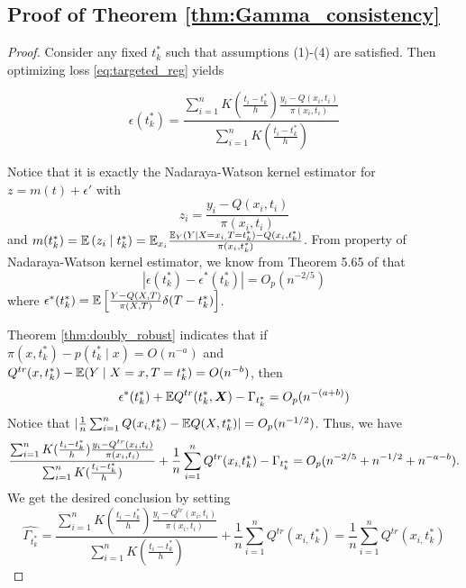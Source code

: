 \subsection{Proof of Theorem \ref{thm:Gamma_consistency}}
\begin{proof}
Consider any fixed $t_k^*$ such that assumptions (1)-(4) are satisfied. Then optimizing loss \eqref{eq:targeted_reg} yields

\[
\epsilon(t_{k}^{*})=\frac{\sum_{i=1}^{n}K(\frac{t_{i}-t_{k}^{*}}{h})\frac{y_{i}-Q(x_{i},t_{i})}{\pi(x_{i},t_{i})}}{\sum_{i=1}^{n}K(\frac{t_{i}-t_{k}^{*}}{h})}
\]

Notice that it is exactly the Nadaraya-Watson kernel estimator for $z=m(t)+\epsilon'$ with
\[
z_{i}=\frac{y_{i}-Q(x_{i},t_{i})}{\pi(x_{i},t_{i})}
\]
 and $m(t_{k}^{*})=\mathbb{E}\left(z_{i}\mid t_{k}^{*}\right)=\mathbb{E}_{x_{i}}\frac{\mathbb{E}_{Y}\left(Y\mid X=x_{i,}T=t_{k}^{*}\right)-Q(x_{i},t_{k}^{*})}{\pi(x_{i},t_{k}^{*})}$.
From property of Nadaraya-Watson kernel estimator, we know from Theorem 5.65 of \cite{wasserman2006all} that 
\[
|\epsilon(t_k^*)-\epsilon^{*}(t_k^*)|=O_p(n^{-2/5})
\]
where $\epsilon^{*}(t_k^*)=\mathbb{E}\left[\frac{Y-Q(X,T)}{\pi(X,T)}\delta(T-t_k^*)\right]$.

Theorem \ref{thm:doubly_robust} indicates that
if $\pi(x,t_k^*)-p(t_k^*\mid x)=O(n^{-a})$ and $Q^{tr}(x,t_k^*)-\mathbb{E}(Y\mid X=x,T=t_k^*)=O(n^{-b})$, then
$$
\epsilon^*(t_k^*)+\mathbb{E} Q^{tr}(t_k^*,\boldsymbol{X})-\Gamma_{t_k^*}=O_p(n^{-(a+b)})
$$
Notice that $|\frac{1}{n}\sum_{i=1}^{n}Q(x_{i,}t_{k}^{*})-\mathbb{E} Q(X,t_{k}^{*})|=O_p(n^{-1/2})$. Thus, we have 
\[
\frac{\sum_{i=1}^{n}K(\frac{t_{i}-t_{k}^{*}}{h})\frac{y_{i}-Q^{tr}(x_{i},t_{i})}{\pi(x_{i},t_{i})}}{\sum_{i=1}^{n}K(\frac{t_{i}-t_{k}^{*}}{h})}+\frac{1}{n}\sum_{i=1}^{n}Q^{tr}(x_{i,}t_{k}^{*})-\Gamma_{t_{k}^{*}}=O_{p}(n^{-2/5}+n^{-1/2}+n^{-a-b}).
\]
We get the desired conclusion by setting
$$
\widehat{\Gamma_{t_{k}^{*}}}
=
\frac{\sum_{i=1}^{n}K(\frac{t_{i}-t_{k}^{*}}{h})\frac{y_{i}-Q^{tr}(x_{i},t_{i})}{\pi(x_{i},t_{i})}}{\sum_{i=1}^{n}K(\frac{t_{i}-t_{k}^{*}}{h})}+\frac{1}{n}\sum_{i=1}^{n}Q^{tr}(x_{i,}t_{k}^{*})
=\frac{1}{n}\sum_{i=1}^{n}Q^{tr}(x_{i,}t_{k}^{*})
$$
\end{proof}
\fi



